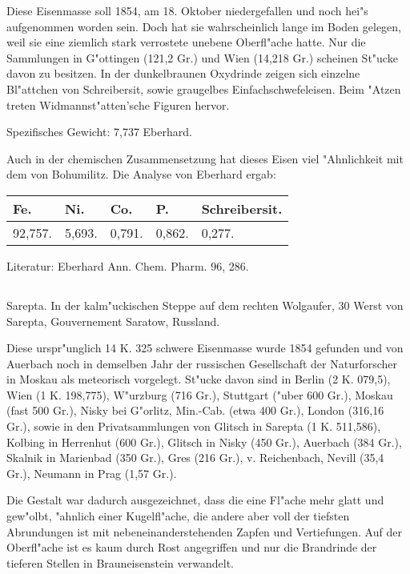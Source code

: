 \documentclass[a4paper, 11pt, oneside]{article}
\begin{document}
Diese Eisenmasse soll 1854, am 18. Oktober niedergefallen und noch hei"s aufgenommen worden sein. Doch hat sie wahrscheinlich lange im Boden gelegen, weil sie eine ziemlich stark verrostete unebene Oberfl"ache hatte. Nur die Sammlungen in G"ottingen (121,2 Gr.) und Wien (14,218 Gr.) scheinen St"ucke davon zu besitzen. In der dunkelbraunen Oxydrinde zeigen sich einzelne Bl"attchen von Schreibersit, sowie graugelbes Einfachschwefeleisen. Beim "Atzen treten Widmannst"atten'sche Figuren hervor.

Spezifisches Gewicht: 7,737 Eberhard.

Auch in der chemischen Zusammensetzung hat dieses Eisen viel "Ahnlichkeit mit dem von Bohumilitz. Die Analyse von Eberhard ergab:
\begin{table}[H]
    \centering\swabfamily\Large
    \begin{tabular}{l l l l l}
        Fe. & Ni. & Co. & P. & Schreibersit. \\ \hline
        92,757. & 5,693. & 0,791. & 0,862. & 0,277. \\
    \end{tabular}
\end{table}

\normalsize
Literatur: Eberhard Ann. Chem. Pharm. 96, 286.

\subsection{}
\LARGE
\paragraph{}
Sarepta. In der kalm"uckischen Steppe auf dem rechten Wolgaufer, 30 Werst von Sarepta, Gouvernement Saratow, Russland.

Diese urspr"unglich 14 K. 325 schwere Eisenmasse wurde 1854 gefunden und von Auerbach noch in demselben Jahr der russischen Gesellschaft der Naturforscher in Moskau als meteorisch vorgelegt. St"ucke davon sind in Berlin (2 K. 079,5), Wien (1 K. 198,775), W"urzburg (716 Gr.), Stuttgart ("uber 600 Gr.), Moskau (fast 500 Gr.), Nisky bei G"orlitz, Min.-Cab. (etwa 400 Gr.), London (316,16 Gr.), sowie in den Privatsammlungen von Glitsch in Sarepta (1 K. 511,586), Kolbing in Herrenhut (600 Gr.), Glitsch in Nisky (450 Gr.), Auerbach (384 Gr.), Skalnik in Marienbad (350 Gr.), Gres (216 Gr.), v. Reichenbach, Nevill (35,4 Gr.), Neumann in Prag (1,57 Gr.).

Die Gestalt war dadurch ausgezeichnet, dass die eine Fl"ache mehr glatt und gew"olbt, "ahnlich einer Kugelfl"ache, die andere aber voll der tiefsten Abrundungen ist mit nebeneinanderstehenden Zapfen und Vertiefungen. Auf der Oberfl"ache ist es kaum durch Rost angegriffen und nur die Brandrinde der tieferen Stellen in Brauneisenstein verwandelt.
\end{document}
